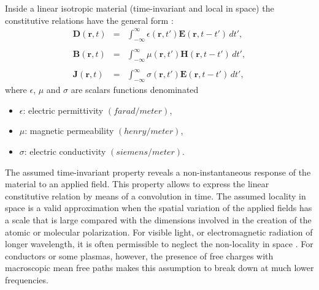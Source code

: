 Inside a linear isotropic material (time-invariant and local in space) the constitutive relations have the general form \cite{Cessenat}:
\begin{eqnarray}
    \mathbf{D}(\mathbf{r},t) &=& \int^{\infty}_{-\infty} \epsilon(\mathbf{r},t')\mathbf{E}(\mathbf{r}, t-t') \, dt', \label{GeneralLinearDE}
    \\\nonumber
	\\[-0.25em]
	\mathbf{B}(\mathbf{r},t) &=& \int^{\infty}_{-\infty} \mu(\mathbf{r},t')\mathbf{H}(\mathbf{r}, t-t') \, dt', \label{GeneralLinearBH}
	\\\nonumber
	\\[-0.25em]
	\mathbf{J}(\mathbf{r},t) &=& \int^{\infty}_{-\infty} \sigma(\mathbf{r},t')\mathbf{E}(\mathbf{r}, t-t') \, dt', \label{GeneralLinearJE}
\end{eqnarray}
where $\epsilon$, $\mu$ and $\sigma$ are scalars functions denominated
\begin{itemize}
	\item[]$\epsilon$: electric permittivity $\left(farad/meter\right)$,
	\item[]$\mu$: magnetic permeability $\left(henry/meter\right)$,
	\item[]$\sigma$: electric conductivity $\left(siemens/meter\right)$.
\end{itemize}
The assumed time-invariant property reveals a non-instantaneous response of the material to an applied field. This property allows to express the linear constitutive relation by means of a convolution in time. The assumed locality in space is a valid approximation when the spatial variation of the applied fields has a scale that is large compared with the dimensions involved in the creation of the atomic or molecular polarization. For visible light, or electromagnetic radiation of longer wavelength, it is often permissible to neglect the non-locality in space \cite{Jackson}. For conductors or some plasmas, however, the presence of free charges with macroscopic mean free paths makes this assumption to break down at much lower frequencies.

